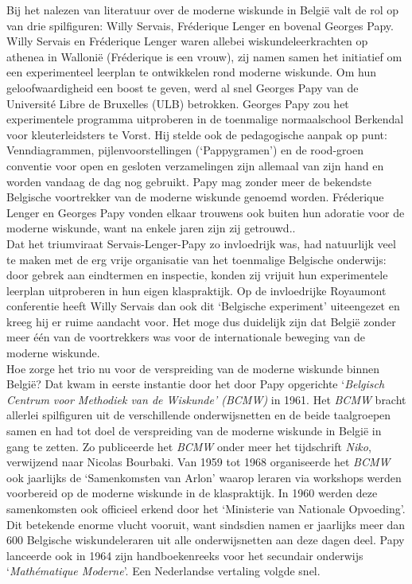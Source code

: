 \documentclass[a4paper,11pt]{article}
\begin{document}
\noindent Bij het nalezen van literatuur over de moderne wiskunde in België
valt de rol op van drie spilfiguren: Willy Servais, Fréderique Lenger en bovenal Georges 
Papy. Willy Servais en Fréderique Lenger waren allebei wiskundeleerkrachten op 
athenea in Wallonië (Fréderique is een vrouw), zij namen samen het initiatief om 
een experimenteel leerplan te ontwikkelen rond moderne wiskunde. Om hun 
geloofwaardigheid een boost te geven, werd al snel Georges Papy van de 
Université Libre de Bruxelles (ULB) betrokken. Georges Papy zou het experimentele 
programma uitproberen in de toenmalige normaalschool Berkendal voor kleuterleidsters 
te Vorst. Hij stelde ook de pedagogische aanpak op punt: 
Venndiagrammen, pijlenvoorstellingen (`Pappygramen') en de rood-groen 
conventie voor open en gesloten verzamelingen zijn allemaal van zijn hand en worden vandaag de dag nog gebruikt. Papy 
mag zonder meer de bekendste Belgische voortrekker van de moderne wiskunde genoemd worden. 
Fréderique Lenger en Georges Papy vonden elkaar trouwens ook buiten hun adoratie voor de moderne wiskunde, 
want na enkele jaren zijn zij getrouwd..\\

\noindent Dat het triumviraat Servais-Lenger-Papy zo invloedrijk was, had natuurlijk veel 
te maken met de erg vrije organisatie van het toenmalige Belgische onderwijs: 
door gebrek aan eindtermen en inspectie, konden zij vrijuit hun experimentele 
leerplan uitproberen in hun eigen klaspraktijk. Op de invloedrijke 
Royaumont conferentie heeft Willy Servais dan ook dit `Belgische experiment' 
uiteengezet en kreeg hij er ruime aandacht voor. Het moge dus duidelijk zijn dat 
België zonder meer één van de voortrekkers was voor de internationale beweging van de moderne 
wiskunde.\\
 
\noindent Hoe zorge het trio nu voor de verspreiding van de moderne wiskunde binnen 
België? Dat kwam in eerste instantie door het door Papy opgerichte `\textit{Belgisch 
Centrum voor Methodiek van de Wiskunde' (BCMW)} in 1961. Het \textit{BCMW} bracht allerlei spilfiguren uit de 
verschillende onderwijsnetten en de beide taalgroepen samen en had tot doel de 
verspreiding van de moderne wiskunde in België in gang te zetten. Zo publiceerde het \textit{BCMW} onder 
meer het tijdschrift \textit{ Niko}, verwijzend naar Nicolas Bourbaki. Van 1959 
tot 1968 organiseerde het \textit{BCMW} ook jaarlijks de `Samenkomsten van 
Arlon' waarop leraren via workshops werden voorbereid op de moderne wiskunde in 
de klaspraktijk. In 1960 werden deze samenkomsten ook officieel erkend door het 
`Ministerie van Nationale Opvoeding'. Dit betekende enorme vlucht vooruit, want 
sindsdien namen er jaarlijks meer dan 600 Belgische wiskundeleraren uit alle 
onderwijsnetten aan deze dagen deel. Papy lanceerde ook in 1964 zijn 
handboekenreeks voor het secundair onderwijs `\textit{Mathématique Moderne}'. 
Een Nederlandse vertaling volgde snel.\\
\end{document}
